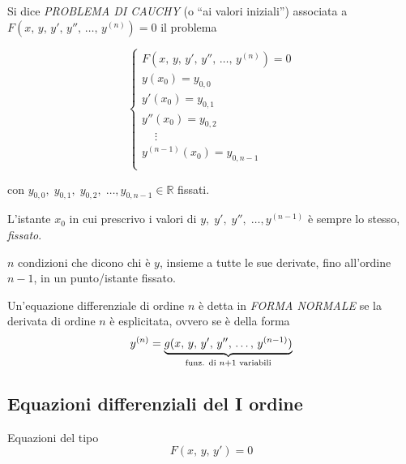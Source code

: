 \begin{definition}
    Si dice \emph{PROBLEMA DI CAUCHY} (o “ai valori iniziali”) associata a $F(x, \, y, \, y', \, y'', \, \dotsc, \, y^{(n)}) =  0$ il problema

    \begin{equation}
        \begin{cases}
            F(x, \, y, \, y', \, y'', \, \dotsc, \, y^{(n)}) =  0 \\
            y(x_0) = y_{0,0} \\
            y'(x_0) = y_{0,1} \\
            y''(x_0) = y_{0,2} \\
            \phantom{xx}\vdots \\
            y^{(n-1)}(x_0) = y_{0,n-1} \\
        \end{cases}
    \end{equation}    

    con $y_{0,0}, \; y_{0,1}, \; y_{0,2}, \; \dotsc, y_{0,n-1}\in \mathbb{R}$ fissati.

    L’istante $x_0$ in cui prescrivo i valori di $y, \; y', \; y'', \; \dotsc, y^{(n-1)}$ è sempre lo stesso, \emph{fissato}.

\end{definition}
$n$ condizioni che dicono chi è $y$, insieme a tutte le sue derivate, fino all’ordine $n-1$, in un punto/istante fissato.

\begin{definition}
    Un’equazione differenziale di ordine $n$ è detta in \emph{FORMA NORMALE} se la derivata di ordine $n$ è esplicitata, ovvero se è della forma
    \begin{equation}
        y^{(n)} = \underbrace{g(x, \,y, \, y', \, y'', \, \dotsc, \, y^{(n-1)})}_{\textnormal{funz. di } n + 1 \textnormal{ variabili}}
    \end{equation}
\end{definition}

\subsection{Equazioni differenziali del I ordine}
Equazioni del tipo
\begin{equation}
    F(x, \, y, \, y') = 0
    \label{primo_ord}
\end{equation}

